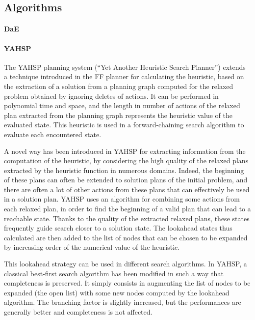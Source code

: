 \documentclass{sig-alternate}
\begin{document}
\subsection{Algorithms}

\paragraph{DaE} %
\paragraph{YAHSP} %

The   YAHSP  planning   system  (``Yet   Another  Heuristic   Search  Planner'')
\cite{yahsp:icaps2004}  extends  a  technique   introduced  in  the  FF  planner
\cite{ff:jair01}  for calculating  the  heuristic, based  on  the extraction  of
a solution  from a planning graph  computed for the relaxed  problem obtained by
ignoring deletes of actions.  It can  be performed in polynomial time and space,
and  the length in  number of  actions of  the relaxed  plan extracted  from the
planning  graph represents  the heuristic  value of  the evaluated  state.  This
heuristic  is used  in  a  forward-chaining search  algorithm  to evaluate  each
encountered state.

A novel  way has been  introduced in YAHSP  for extracting information  from the
computation of  the heuristic,  by considering the  high quality of  the relaxed
plans  extracted by  the heuristic  function in  numerous domains.   Indeed, the
beginning of these plans can often  be extended to solution plans of the initial
problem, and there  are often a lot  of other actions from these  plans that can
effectively be  used in a solution  plan. YAHSP uses an  algorithm for combining
some actions from each  relaxed plan, in order to find the  beginning of a valid
plan that can lead to a reachable  state. Thanks to the quality of the extracted
relaxed  plans,  these states  frequently  guide  search  closer to  a  solution
state. The lookahead states thus calculated  are then added to the list of nodes
that can be chosen to be expanded  by increasing order of the numerical value of
the  heuristic.

This lookahead  strategy can be used  in different search  algorithms. In YAHSP,
a classical  best-first search algorithm  has been modified  in such a  way that
completeness is preserved.   It simply consists in augmenting  the list of nodes
to be  expanded (the open  list) with some  new nodes computed by  the lookahead
algorithm.  The branching factor is slightly increased, but the performances are
generally better and completeness is not affected.
\end{document}
